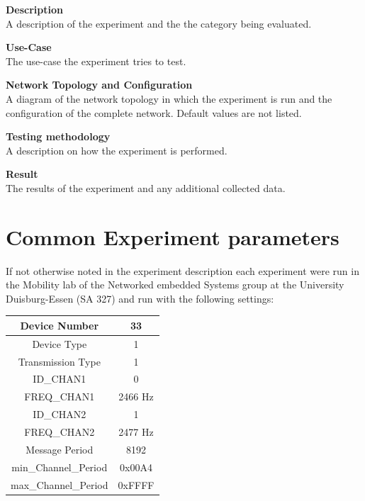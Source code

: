 \begin{description}
\item{\textbf{Description}} \hfill \\ A description of the experiment and the the category being evaluated.
\item{\textbf{Use-Case}} \hfill \\ The use-case the experiment tries to test.
\item{\textbf{Network Topology and Configuration}} \hfill \\ A diagram of the network topology in which the experiment is run and the configuration of the complete network. Default values are not listed.
\item{\textbf{Testing methodology}} \hfill \\ A description on how the experiment is performed.
\item{\textbf{Result}} \hfill \\ The results of the experiment and any additional collected data.
\end{description}

\newpage

\section{Common Experiment parameters}

If not otherwise noted in the experiment description each experiment were run in the Mobility lab of the Networked embedded Systems group at the University Duisburg-Essen (SA 327) and run with the following settings:
\begin{center}
\begin{tabular}{|c|c|}
	\hline Device Number & 33 \\ 
	\hline Device Type & 1 \\ 
	\hline Transmission Type & 1 \\ 
	\hline ID\_CHAN1 & 0 \\ 
	\hline FREQ\_CHAN1 & 2466 Hz \\ 
	\hline ID\_CHAN2 & 1 \\ 
	\hline FREQ\_CHAN2 & 2477 Hz \\ 
	\hline Message Period & 8192 \\ 
	\hline min\_Channel\_Period & 0x00A4 \\ 
	\hline max\_Channel\_Period & 0xFFFF \\ 
	\hline 
\end{tabular} 		
\end{center}

